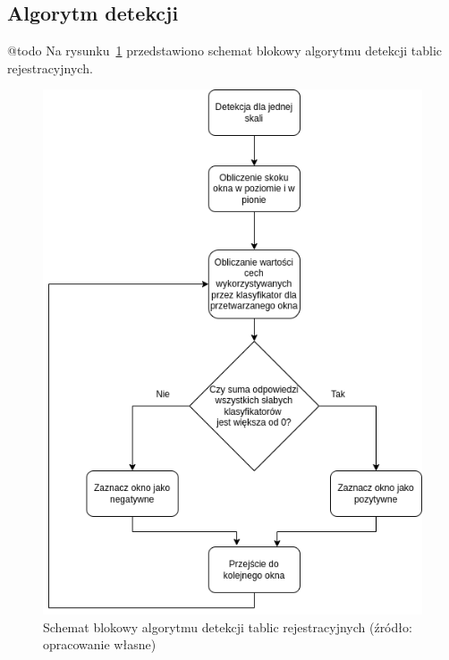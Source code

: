 \subsection{Algorytm detekcji}
@todo
Na rysunku~\ref{fig:detection_alg} przedstawiono schemat blokowy algorytmu detekcji tablic rejestracyjnych.
\begin{figure}[!ht]
    \centering
    \includegraphics[scale=0.4]{Pictures/detection_alg}
    \caption{Schemat blokowy algorytmu detekcji tablic rejestracyjnych (źródło: opracowanie własne)}
    \label{fig:detection_alg}
\end{figure}
\FloatBarrier

